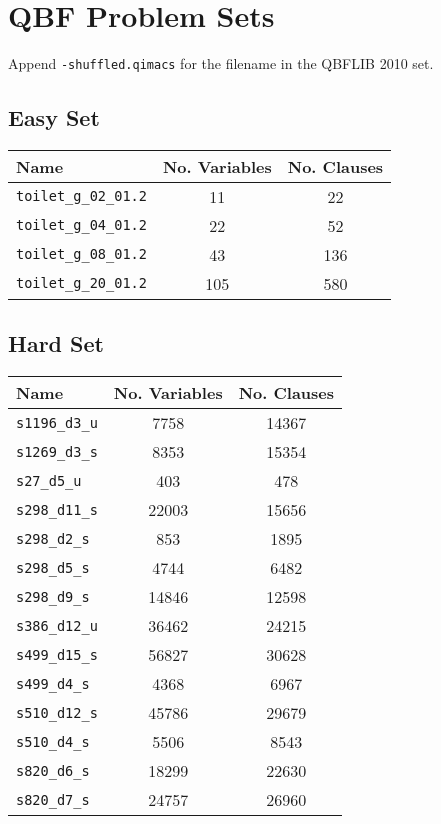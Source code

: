 \chapter{QBF Problem Sets} \label{qbfproblemsets}

Append \texttt{-shuffled.qimacs} for the filename in the QBFLIB 2010 set.

\section{Easy Set}

\begin{center}
\begin{tabular}{| l | S[table-format=3.2] | S[table-format=3.2] |}
\hline
\textbf{Name} & \textbf{No. Variables} & \textbf{No. Clauses} \\ \hline
\texttt{toilet\_g\_02\_01.2} & 11 & 22 \\
\texttt{toilet\_g\_04\_01.2} & 22 & 52 \\
\texttt{toilet\_g\_08\_01.2} & 43 & 136 \\
\texttt{toilet\_g\_20\_01.2} & 105 & 580 \\
\hline
\end{tabular}
\end{center}

\section{Hard Set}

\begin{center}
\begin{tabular}{| l | S[table-format=3.2] | S[table-format=3.2] |}
\hline
\textbf{Name} & \textbf{No. Variables} & \textbf{No. Clauses} \\ \hline
\texttt{s1196\_d3\_u} & 7758 & 14367 \\
\texttt{s1269\_d3\_s} & 8353 & 15354 \\
\texttt{s27\_d5\_u} & 403 & 478 \\
\texttt{s298\_d11\_s} & 22003 & 15656 \\
\texttt{s298\_d2\_s} & 853 & 1895 \\
\texttt{s298\_d5\_s} & 4744 & 6482 \\
\texttt{s298\_d9\_s} & 14846 & 12598 \\
\texttt{s386\_d12\_u} & 36462 & 24215 \\
\texttt{s499\_d15\_s} & 56827 & 30628 \\
\texttt{s499\_d4\_s} & 4368 & 6967 \\
\texttt{s510\_d12\_s} & 45786 & 29679 \\
\texttt{s510\_d4\_s} & 5506 & 8543 \\
\texttt{s820\_d6\_s} & 18299 & 22630 \\
\texttt{s820\_d7\_s} & 24757 & 26960 \\
\hline
\end{tabular}
\end{center}
